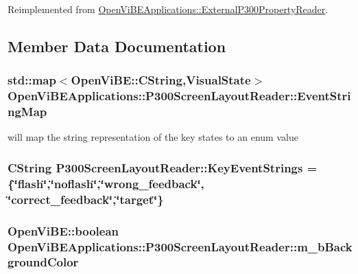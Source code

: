 Reimplemented from \hyperlink{classOpenViBEApplications_1_1ExternalP300PropertyReader_a8a191585eae83876f09c53c1f7b42cc3}{OpenViBEApplications::ExternalP300PropertyReader}.



\subsection{Member Data Documentation}
\hypertarget{classOpenViBEApplications_1_1P300ScreenLayoutReader_a21768f09c053da393143377b54b28141}{
\subsubsection[{EventStringMap}]{\setlength{\rightskip}{0pt plus 5cm}std::map$<$OpenViBE::CString,{\bf VisualState}$>$ {\bf OpenViBEApplications::P300ScreenLayoutReader::EventStringMap}}}
\label{classOpenViBEApplications_1_1P300ScreenLayoutReader_a21768f09c053da393143377b54b28141}
will map the string representation of the key states to an enum value \hypertarget{classOpenViBEApplications_1_1P300ScreenLayoutReader_a81215a28076035f0ef7aa51879c4839f}{
\subsubsection[{KeyEventStrings}]{\setlength{\rightskip}{0pt plus 5cm}CString {\bf P300ScreenLayoutReader::KeyEventStrings} = \{\char`\"{}flash\char`\"{},\char`\"{}noflash\char`\"{},\char`\"{}wrong\_\-feedback\char`\"{}, \char`\"{}correct\_\-feedback\char`\"{},\char`\"{}target\char`\"{}\}}}
\label{classOpenViBEApplications_1_1P300ScreenLayoutReader_a81215a28076035f0ef7aa51879c4839f}
\hypertarget{classOpenViBEApplications_1_1P300ScreenLayoutReader_a06265a57fb8b963afcf3372cbfcf85f3}{
\subsubsection[{m\_\-bBackgroundColor}]{\setlength{\rightskip}{0pt plus 5cm}OpenViBE::boolean {\bf OpenViBEApplications::P300ScreenLayoutReader::m\_\-bBackgroundColor}}}
